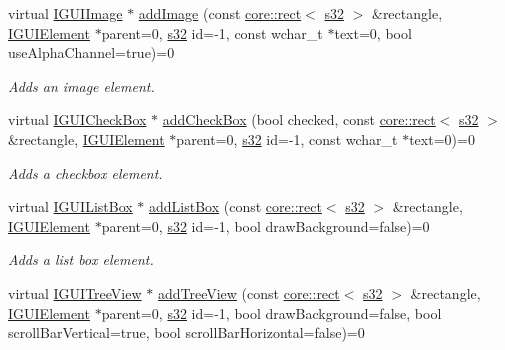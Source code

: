 \begin{DoxyCompactItemize}
virtual \hyperlink{classirr_1_1gui_1_1IGUIImage}{I\+G\+U\+I\+Image} $\ast$ \hyperlink{classirr_1_1gui_1_1IGUIEnvironment_a0f84bdf59447419bb0555f001f68d889}{add\+Image} (const \hyperlink{classirr_1_1core_1_1rect}{core\+::rect}$<$ \hyperlink{namespaceirr_ac66849b7a6ed16e30ebede579f9b47c6}{s32} $>$ \&rectangle, \hyperlink{classirr_1_1gui_1_1IGUIElement}{I\+G\+U\+I\+Element} $\ast$parent=0, \hyperlink{namespaceirr_ac66849b7a6ed16e30ebede579f9b47c6}{s32} id=-\/1, const wchar\+\_\+t $\ast$text=0, bool use\+Alpha\+Channel=true)=0
\begin{DoxyCompactList}\small\item\em Adds an image element. \end{DoxyCompactList}\item 
virtual \hyperlink{classirr_1_1gui_1_1IGUICheckBox}{I\+G\+U\+I\+Check\+Box} $\ast$ \hyperlink{classirr_1_1gui_1_1IGUIEnvironment_a849a6970cda901fbcf745c757b46212e}{add\+Check\+Box} (bool checked, const \hyperlink{classirr_1_1core_1_1rect}{core\+::rect}$<$ \hyperlink{namespaceirr_ac66849b7a6ed16e30ebede579f9b47c6}{s32} $>$ \&rectangle, \hyperlink{classirr_1_1gui_1_1IGUIElement}{I\+G\+U\+I\+Element} $\ast$parent=0, \hyperlink{namespaceirr_ac66849b7a6ed16e30ebede579f9b47c6}{s32} id=-\/1, const wchar\+\_\+t $\ast$text=0)=0
\begin{DoxyCompactList}\small\item\em Adds a checkbox element. \end{DoxyCompactList}\item 
virtual \hyperlink{classirr_1_1gui_1_1IGUIListBox}{I\+G\+U\+I\+List\+Box} $\ast$ \hyperlink{classirr_1_1gui_1_1IGUIEnvironment_af5990b3ad8c9bdc65e645a4cb508ad5f}{add\+List\+Box} (const \hyperlink{classirr_1_1core_1_1rect}{core\+::rect}$<$ \hyperlink{namespaceirr_ac66849b7a6ed16e30ebede579f9b47c6}{s32} $>$ \&rectangle, \hyperlink{classirr_1_1gui_1_1IGUIElement}{I\+G\+U\+I\+Element} $\ast$parent=0, \hyperlink{namespaceirr_ac66849b7a6ed16e30ebede579f9b47c6}{s32} id=-\/1, bool draw\+Background=false)=0
\begin{DoxyCompactList}\small\item\em Adds a list box element. \end{DoxyCompactList}\item 
virtual \hyperlink{classirr_1_1gui_1_1IGUITreeView}{I\+G\+U\+I\+Tree\+View} $\ast$ \hyperlink{classirr_1_1gui_1_1IGUIEnvironment_a3c82300cf7eaabc451ef20a04b432c32}{add\+Tree\+View} (const \hyperlink{classirr_1_1core_1_1rect}{core\+::rect}$<$ \hyperlink{namespaceirr_ac66849b7a6ed16e30ebede579f9b47c6}{s32} $>$ \&rectangle, \hyperlink{classirr_1_1gui_1_1IGUIElement}{I\+G\+U\+I\+Element} $\ast$parent=0, \hyperlink{namespaceirr_ac66849b7a6ed16e30ebede579f9b47c6}{s32} id=-\/1, bool draw\+Background=false, bool scroll\+Bar\+Vertical=true, bool scroll\+Bar\+Horizontal=false)=0

\end{DoxyCompactItemize}
